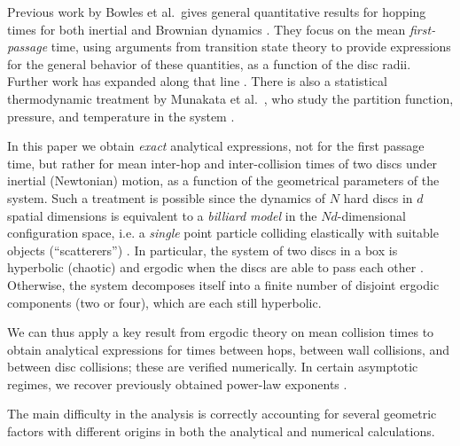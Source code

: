 \documentclass[superscriptaddress,pre,reprint,showpacs,twocolumn]{revtex4-1}
\newcommand{\etal}{et al.\ }
\begin{document}
 
Previous work
by Bowles \etal gives general quantitative results for hopping times 
for both inertial and Brownian dynamics \cite{Bowles04}. They focus
on the mean \emph{first-passage} time, using arguments from transition state theory 
to provide expressions for the general behavior of these quantities, as a function of the
disc radii. %
Further work has expanded along that line  \cite{Suh05, Ball09}.
There is also a statistical thermodynamic treatment by Munakata \etal, 
who study the partition function, pressure,
and temperature in the system \cite{Munakata02, Munakata06}. 


In this paper we obtain \emph{exact} analytical expressions, not for the first passage time,
but rather for mean inter-hop and inter-collision times of two discs under 
inertial (Newtonian) motion, as a function of the geometrical parameters of the system. Such a treatment is possible
 since the dynamics of $N$ hard discs in $d$ spatial dimensions
 is equivalent to a \emph{billiard model} in the $Nd$-dimensional configuration space, i.e. a \emph{single} point particle colliding elastically 
with suitable objects (``scatterers'') \cite{SzaszBook00}. 
In particular, the system of two discs in a box is hyperbolic (chaotic) and ergodic when the discs are able to pass each other \cite{Sim99}. Otherwise, the system decomposes itself into
a finite number of disjoint ergodic components (two or four), which are each still hyperbolic.

We can thus apply a key result from ergodic theory on mean collision times \cite{Chernov97} to obtain analytical expressions 
for times between hops, between wall collisions, and between disc collisions; these are verified numerically. 
In certain asymptotic regimes, we recover previously obtained power-law exponents \cite{Bowles04}.

The main difficulty in the analysis is correctly accounting for several geometric factors with different origins in both the
analytical and numerical calculations.

\end{document}
